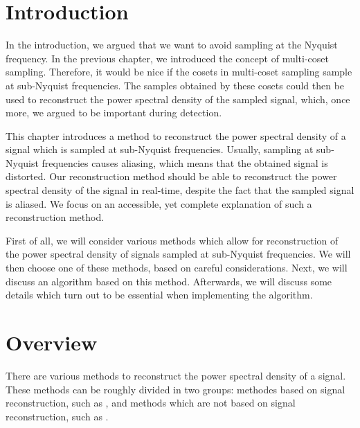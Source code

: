 \documentclass[a4paper, openany, oneside]{memoir}
\begin{document}

\section{Introduction}
In the introduction, we argued that we want to avoid sampling at the Nyquist frequency. In the previous chapter, we introduced the concept of multi-coset sampling. Therefore, it would be nice if the cosets in multi-coset sampling sample at sub-Nyquist frequencies. The samples obtained by these cosets could then be used to reconstruct the power spectral density of the sampled signal, which, once more, we argued to be important during detection.

This chapter introduces a method to reconstruct the power spectral density of a signal which is sampled at sub-Nyquist frequencies. Usually, sampling at sub-Nyquist frequencies causes aliasing, which means that the obtained signal is distorted. Our reconstruction method should be able to reconstruct the power spectral density of the signal in real-time, despite the fact that the sampled signal is aliased. We focus on an accessible, yet complete explanation of such a reconstruction method.

First of all, we will consider various methods which allow for reconstruction of the power spectral density of signals sampled at sub-Nyquist frequencies. We will then choose one of these methods, based on careful considerations. Next, we will discuss an algorithm based on this method. Afterwards, we will discuss some details which turn out to be essential when implementing the algorithm.


\section{Overview}
There are various methods to reconstruct the power spectral density of a signal. These methods can be roughly divided in two groups: methodes based on signal reconstruction, such as \cite{bayarkernel, candes2006robust, candes2007sparsity, candes2008introduction, kirolos2006analog, li2014gomp, polo2009compressive, pal2011coprime}, and methods which are not based on signal reconstruction, such as \cite{ariananda2011multicoset,ariananda2012compressive}.
\end{document}
